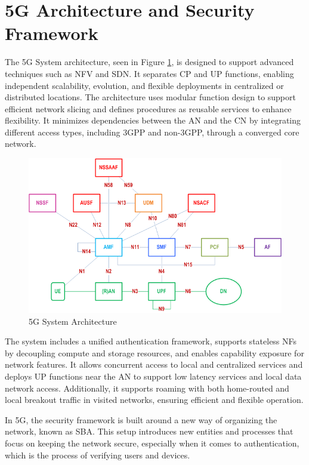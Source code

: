 \section{\acs{5G} Architecture and Security Framework}

The \ac{5G} System architecture, seen in Figure \ref{fig:5G-system-architecture}, is designed to support advanced techniques such as \ac{NFV} and \ac{SDN}. It separates \ac{CP} and \ac{UP} functions, enabling independent scalability, evolution, and flexible deployments in centralized or distributed locations. The architecture uses modular function design to support efficient network slicing and defines procedures as reusable services to enhance flexibility. It minimizes dependencies between the \ac{AN} and the \ac{CN} by integrating different access types, including \ac{3GPP} and non-\ac{3GPP}, through a converged core network.

\begin{figure}
    \centering
    \includegraphics[width=0.75\linewidth]{figs/5g-system-architecture.png}
    \caption{\ac{5G} System Architecture}
    \label{fig:5G-system-architecture}
\end{figure}

The system includes a unified authentication framework, supports stateless \acp{NF} by decoupling compute and storage resources, and enables capability exposure for network features. It allows concurrent access to local and centralized services and deploys \ac{UP} functions near the \acl{AN} to support low latency services and local data network access. Additionally, it supports roaming with both home-routed and local breakout traffic in visited networks, ensuring efficient and flexible operation.%

In \ac{5G}, the security framework is built around a new way of organizing the network, known as \ac{SBA}. This setup introduces new entities and processes that focus on keeping the network secure, especially when it comes to authentication, which is the process of verifying users and devices.

